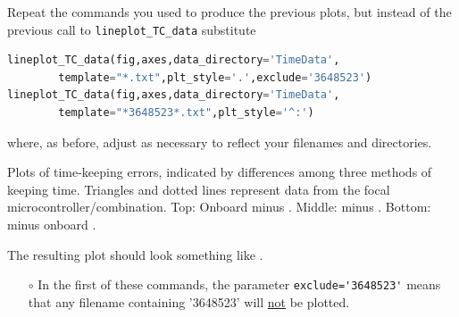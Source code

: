\begin{enumerate}
	Repeat the commands you used to produce the previous plots, but instead of the previous call to \lstinline{lineplot_TC_data} substitute
\begin{lstlisting}[language=Python]
lineplot_TC_data(fig,axes,data_directory='TimeData',
        template="*.txt",plt_style='.',exclude='3648523')
lineplot_TC_data(fig,axes,data_directory='TimeData', 
        template="*3648523*.txt",plt_style='^:')
\end{lstlisting}
	where, as before, adjust as necessary to reflect your filenames and directories.
	\begin{marginfigure}[-19.cm]
		\begin{center}
			\caption[Plots of time-keeping errors]{Plots of time-keeping errors, indicated by differences among three methods of keeping time. 
			Triangles and dotted lines represent data from the focal microcontroller/\rtc combination. 
			Top: Onboard \rtc minus  \rtc. Middle: \ntp minus  \rtc. Bottom: \ntp minus onboard \rtc. }
		\end{center}
	\end{marginfigure}
	The resulting plot should look something like .
	\begin{itemize}
		\item[$\circ$] In the first of these commands, the parameter \lstinline{exclude='3648523'} means that any filename containing '3648523' will \underline{not} be plotted. 
		

\end{itemize}
\end{enumerate}
